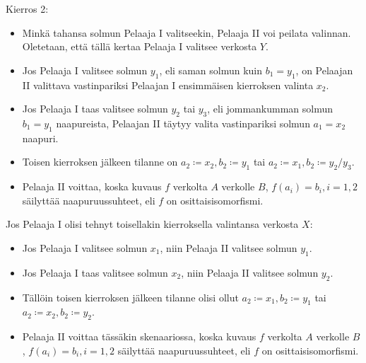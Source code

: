 \documentclass[finnish]{tktltiki2}
\theoremstyle{definition}
\theoremstyle{remark}
\begin{document}
Kierros 2:
\begin{itemize}
  \item Minkä tahansa solmun Pelaaja I valitseekin, Pelaaja II voi peilata valinnan. Oletetaan, että tällä kertaa Pelaaja I valitsee verkosta $Y$.
  \item Jos Pelaaja I valitsee solmun $y_1$, eli saman solmun kuin $b_1 = y_1$, on Pelaajan II valittava vastinpariksi Pelaajan I ensimmäisen kierroksen valinta $x_2$.
  \item Jos Pelaaja I taas valitsee solmun $y_2$ tai $y_3$, eli jommankumman solmun $b_1 = y_1$ naapureista, Pelaajan II täytyy valita vastinpariksi solmun $a_1 = x_2$ naapuri.
  \item Toisen kierroksen jälkeen tilanne on $a_2 \coloneqq x_2, b_2 \coloneqq y_1$ tai $a_2 \coloneqq x_1, b_2 \coloneqq y_2/y_3$.
  \item Pelaaja II voittaa, koska kuvaus $f$ verkolta $A$ verkolle $B$, $f(a_i) = b_i, i = 1, 2$ säilyttää naapuruussuhteet, eli $f$ on osittaisisomorfismi.
\end{itemize}

Jos Pelaaja I olisi tehnyt toisellakin kierroksella valintansa verkosta $X$:
\begin{itemize}
\item Jos Pelaaja I valitsee solmun $x_1$, niin Pelaaja II valitsee solmun $y_1$.
\item Jos Pelaaja I taas valitsee solmun $x_2$, niin Pelaaja II valitsee solmun $y_2$.
\item Tällöin toisen kierroksen jälkeen tilanne olisi ollut $a_2 \coloneqq x_1, b_2 \coloneqq y_1$ tai $a_2 \coloneqq x_2, b_2 \coloneqq y_2$.
\item Pelaaja II voittaa tässäkin skenaariossa, koska kuvaus $f$ verkolta $A$ verkolle $B$, $f(a_i) = b_i, i = 1, 2$ säilyttää naapuruussuhteet, eli $f$ on osittaisisomorfismi.
\end{itemize}



 
\newpage
%
%
%
%







% 
\end{document}
